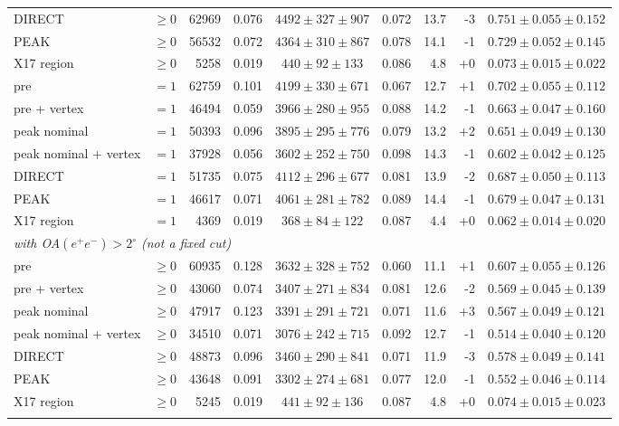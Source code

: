\begin{table}[H]
\begin{tabular}{llrrcrrrc}
DIRECT & $\geq0$ & 62969 & 0.076 & $4492\pm327\pm907$ & 0.072 & 13.7 & -3 & $0.751\pm0.055\pm0.152$ \\
PEAK & $\geq0$ & 56532 & 0.072 & $4364\pm310\pm867$ & 0.078 & 14.1 & -1 & $0.729\pm0.052\pm0.145$ \\
X17 region & $\geq0$ & 5258 & 0.019 & $440\pm92\pm133$ & 0.086 & 4.8 & +0 & $0.073\pm0.015\pm0.022$ \\
\addlinespace
pre & $=1$ & 62759 & 0.101 & $4199\pm330\pm671$ & 0.067 & 12.7 & +1 & $0.702\pm0.055\pm0.112$ \\
pre + vertex & $=1$ & 46494 & 0.059 & $3966\pm280\pm955$ & 0.088 & 14.2 & -1 & $0.663\pm0.047\pm0.160$ \\
peak nominal & $=1$ & 50393 & 0.096 & $3895\pm295\pm776$ & 0.079 & 13.2 & +2 & $0.651\pm0.049\pm0.130$ \\
peak nominal + vertex & $=1$ & 37928 & 0.056 & $3602\pm252\pm750$ & 0.098 & 14.3 & -1 & $0.602\pm0.042\pm0.125$ \\
DIRECT & $=1$ & 51735 & 0.075 & $4112\pm296\pm677$ & 0.081 & 13.9 & -2 & $0.687\pm0.050\pm0.113$ \\
PEAK & $=1$ & 46617 & 0.071 & $4061\pm281\pm782$ & 0.089 & 14.4 & -1 & $0.679\pm0.047\pm0.131$ \\
X17 region & $=1$ & 4369 & 0.019 & $368\pm84\pm122$ & 0.087 & 4.4 & +0 & $0.062\pm0.014\pm0.020$ \\
\midrule
\multicolumn{9}{l}{\emph{with OA$(e^+e^-)>2^\circ$ (not a fixed cut)}} \\
pre & $\geq0$ & 60935 & 0.128 & $3632\pm328\pm752$ & 0.060 & 11.1 & +1 & $0.607\pm0.055\pm0.126$ \\
pre + vertex & $\geq0$ & 43060 & 0.074 & $3407\pm271\pm834$ & 0.081 & 12.6 & -2 & $0.569\pm0.045\pm0.139$ \\
peak nominal & $\geq0$ & 47917 & 0.123 & $3391\pm291\pm721$ & 0.071 & 11.6 & +3 & $0.567\pm0.049\pm0.121$ \\
peak nominal + vertex & $\geq0$ & 34510 & 0.071 & $3076\pm242\pm715$ & 0.092 & 12.7 & -1 & $0.514\pm0.040\pm0.120$ \\
DIRECT & $\geq0$ & 48873 & 0.096 & $3460\pm290\pm841$ & 0.071 & 11.9 & -3 & $0.578\pm0.049\pm0.141$ \\
PEAK & $\geq0$ & 43648 & 0.091 & $3302\pm274\pm681$ & 0.077 & 12.0 & -1 & $0.552\pm0.046\pm0.114$ \\
X17 region & $\geq0$ & 5245 & 0.019 & $441\pm92\pm136$ & 0.087 & 4.8 & +0 & $0.074\pm0.015\pm0.023$ \\
\addlinespace

\end{tabular}
\end{table}
